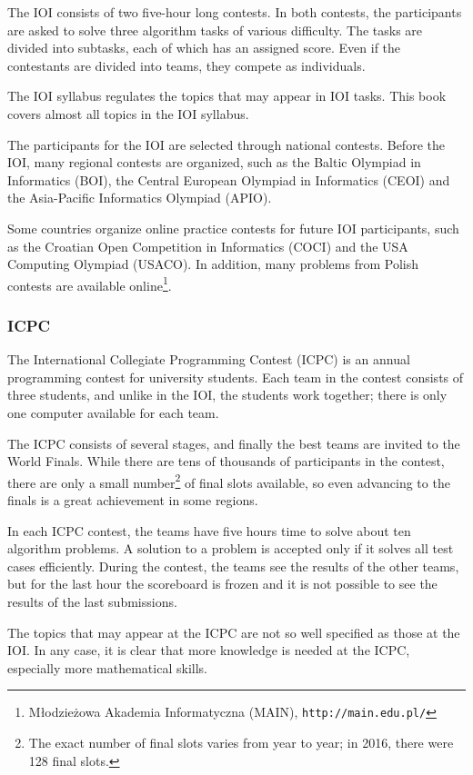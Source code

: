 The IOI consists of two five-hour long contests.
In both contests, the participants are asked to
solve three algorithm tasks of various difficulty.
The tasks are divided into subtasks,
each of which has an assigned score.
Even if the contestants are divided into teams,
they compete as individuals.

The IOI syllabus \cite{iois} regulates the topics
that may appear in IOI tasks.
This book covers almost all topics in the IOI syllabus.

The participants for the IOI are selected through
national contests.
Before the IOI, many regional contests are organized,
such as the Baltic Olympiad in Informatics (BOI),
the Central European Olympiad in Informatics (CEOI)
and the Asia-Pacific Informatics Olympiad (APIO).

Some countries organize online practice contests
for future IOI participants,
such as the Croatian Open Competition in Informatics (COCI)
and the USA Computing Olympiad (USACO).
In addition,
many problems from Polish contests
are available online\footnote{Młodzieżowa Akademia Informatyczna (MAIN), \texttt{http://main.edu.pl/}}.

\subsubsection{ICPC}

The International Collegiate Programming Contest (ICPC)
is an annual programming contest for university students.
Each team in the contest consists of three students,
and unlike in the IOI, the students work together;
there is only one computer available for each team.

The ICPC consists of several stages, and finally the
best teams are invited to the World Finals.
While there are tens of thousands of participants
in the contest, there are only a small number\footnote{The exact number of final
slots varies from year to year; in 2016, there were 128 final slots.} of final slots available,
so even advancing to the finals
is a great achievement in some regions.

In each ICPC contest, the teams have five hours time to solve
about ten algorithm problems.
A solution to a problem is accepted only if it solves
all test cases efficiently.
During the contest, the teams see the results of the other teams,
but for the last hour the scoreboard is frozen and it
is not possible to see the results of the last submissions.

The topics that may appear at the ICPC are not so well
specified as those at the IOI.
In any case, it is clear that more knowledge is needed
at the ICPC, especially more mathematical skills.

